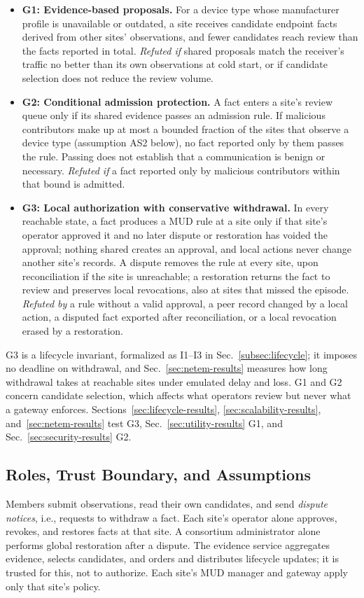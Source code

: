 \documentclass[journal]{IEEEtran}
\theoremstyle{definition}
\begin{document}
\begin{itemize}
\item \textbf{G1: Evidence-based proposals.} For a device type whose manufacturer profile is unavailable or outdated, a site receives candidate endpoint facts derived from other sites' observations, and fewer candidates reach review than the facts reported in total. \emph{Refuted if} shared proposals match the receiver's traffic no better than its own observations at cold start, or if candidate selection does not reduce the review volume.

\item \textbf{G2: Conditional admission protection.} A fact enters a site's review queue only if its shared evidence passes an admission rule. If malicious contributors make up at most a bounded fraction of the sites that observe a device type (assumption AS2 below), no fact reported only by them passes the rule. Passing does not establish that a communication is benign or necessary. \emph{Refuted if} a fact reported only by malicious contributors within that bound is admitted.

\item \textbf{G3: Local authorization with conservative withdrawal.} In every reachable state, a fact produces a MUD rule at a site only if that site's operator approved it and no later dispute or restoration has voided the approval; nothing shared creates an approval, and local actions never change another site's records. A dispute removes the rule at every site, upon reconciliation if the site is unreachable; a restoration returns the fact to review and preserves local revocations, also at sites that missed the episode. \emph{Refuted by} a rule without a valid approval, a peer record changed by a local action, a disputed fact exported after reconciliation, or a local revocation erased by a restoration.
\end{itemize}

G3 is a lifecycle invariant, formalized as I1--I3 in Sec.~\ref{subsec:lifecycle}; it imposes no deadline on withdrawal, and Sec.~\ref{sec:netem-results} measures how long withdrawal takes at reachable sites under emulated delay and loss. G1 and G2 concern candidate selection, which affects what operators review but never what a gateway enforces. Sections~\ref{sec:lifecycle-results}, \ref{sec:scalability-results}, and~\ref{sec:netem-results} test G3, Sec.~\ref{sec:utility-results} G1, and Sec.~\ref{sec:security-results} G2.

\subsection{Roles, Trust Boundary, and Assumptions}
\label{subsec:trust}
Members submit observations, read their own candidates, and send \emph{dispute notices}, i.e., requests to withdraw a fact. Each site's operator alone approves, revokes, and restores facts at that site. A consortium administrator alone performs global restoration after a dispute. The evidence service aggregates evidence, selects candidates, and orders and distributes lifecycle updates; it is trusted for this, not to authorize. Each site's MUD manager and gateway apply only that site's policy.
\end{document}
